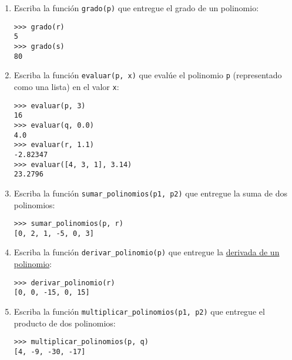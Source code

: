 \begin{enumerate}
\item
  Escriba la función \lstinline!grado(p)! que entregue el grado de un
  polinomio:

\begin{lstlisting}
>>> grado(r)
5
>>> grado(s)
80
\end{lstlisting}
\item
  Escriba la función \lstinline!evaluar(p, x)! que evalúe el polinomio
  \lstinline!p! (representado como una lista) en el valor \lstinline!x!:

\begin{lstlisting}
>>> evaluar(p, 3)
16
>>> evaluar(q, 0.0)
4.0
>>> evaluar(r, 1.1)
-2.82347
>>> evaluar([4, 3, 1], 3.14)
23.2796
\end{lstlisting}
\item
  Escriba la función \lstinline!sumar_polinomios(p1, p2)! que entregue
  la suma de dos polinomios:

\begin{lstlisting}
>>> sumar_polinomios(p, r)
[0, 2, 1, -5, 0, 3]
\end{lstlisting}
\item
  Escriba la función \lstinline!derivar_polinomio(p)! que entregue la
  \href{http://www.youtube.com/watch?v=7XQMghs\_6vg}{derivada de un
  polinomio}:

\begin{lstlisting}
>>> derivar_polinomio(r)
[0, 0, -15, 0, 15]
\end{lstlisting}
\item
  Escriba la función \lstinline!multiplicar_polinomios(p1, p2)! que
  entregue el producto de dos polinomios:

\begin{lstlisting}
>>> multiplicar_polinomios(p, q)
[4, -9, -30, -17]
\end{lstlisting}
\end{enumerate}
